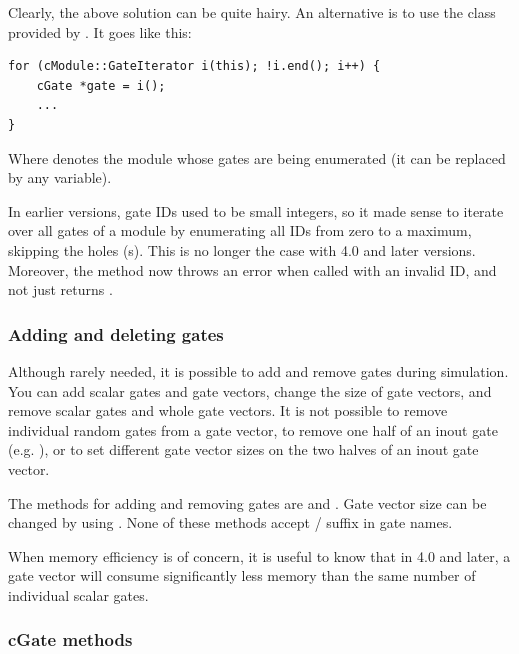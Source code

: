 Clearly, the above solution can be quite hairy. An alternative is to use
the  class provided by .
It goes like this:

\begin{verbatim}
for (cModule::GateIterator i(this); !i.end(); i++) {
    cGate *gate = i();
    ...
}
\end{verbatim}

Where  denotes the module whose gates are being enumerated
(it can be replaced by any  variable).

\begin{note}
    In earlier {\opp} versions, gate IDs used to be small integers, so
    it made sense to iterate over all gates of a module by enumerating
    all IDs from zero to a maximum, skipping the holes (s).
    This is no longer the case with {\opp} 4.0 and later versions.
    Moreover, the  method now throws an error when called
    with an invalid ID, and not just returns .
\end{note}


\subsubsection{Adding and deleting gates}

Although rarely needed, it is possible to add and remove gates during
simulation. You can add scalar gates and gate vectors, change the size of
gate vectors, and remove scalar gates and whole gate vectors.
It is not possible to remove individual random gates from a gate vector,
to remove one half of an inout gate (e.g. ), or to set
different gate vector sizes on the two halves of an inout gate vector.

The  methods for adding and removing gates are
 and .
Gate vector size can be changed by using .
None of these methods accept  /  suffix in gate names.

\begin{note}
    When memory efficiency is of concern, it is useful to know that
    in {\opp} 4.0 and later, a gate vector will consume significantly less
    memory than the same number of individual scalar gates.
\end{note}


\subsubsection{cGate methods}

